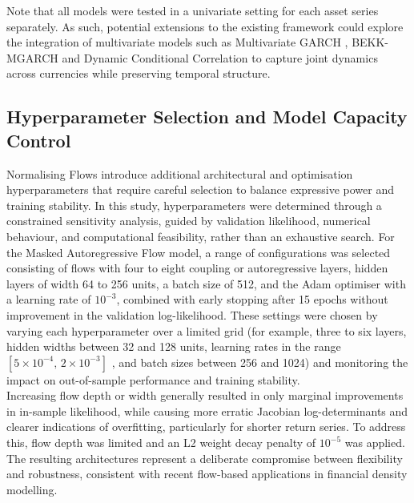\documentclass[oneside,12pt]{CUEDthesisPSnPDF}
\newcommand{\textcite}{\citet}
\begin{document}
Note that all models were tested in a univariate setting for each asset series separately. As such, potential extensions to the existing framework could explore the integration of multivariate models such as Multivariate GARCH \textcite{bollerslev1990modelling}, BEKK-MGARCH \textcite{engle1995multivariate} and Dynamic Conditional Correlation \textcite{engle2002dynamic} to capture joint dynamics across currencies while preserving temporal structure.\\


\subsection{Hyperparameter Selection and Model Capacity Control}
\label{subsec:hyperparams}
\noindent
Normalising Flows introduce additional architectural and optimisation hyperparameters that require careful selection to balance expressive power and training stability. In this study, hyperparameters were determined through a constrained sensitivity analysis, guided by validation likelihood, numerical behaviour, and computational feasibility, rather than an exhaustive search. For the Masked Autoregressive Flow model, a range of configurations was selected consisting of flows with four to eight coupling or autoregressive layers, hidden layers of width 64 to 256 units, a batch size of 512, and the Adam optimiser with a learning rate of $10^{-3}$, combined with early stopping after 15 epochs without improvement in the validation log-likelihood. These settings were chosen by varying each hyperparameter over a limited grid (for example, three to six layers, hidden widths between 32 and 128 units, learning rates in the range $[5 \times 10^{-4},\, 2 \times 10^{-3}]$
, and batch sizes between 256 and 1024) and monitoring the impact on out-of-sample performance and training stability. \\

Increasing flow depth or width generally resulted in only marginal improvements in in-sample likelihood, while causing more erratic Jacobian log-determinants and clearer indications of overfitting, particularly for shorter return series. To address this, flow depth was limited and an L2 weight decay penalty of $10^{-5}$ was applied. The resulting architectures represent a deliberate compromise between flexibility and robustness, consistent with recent flow-based applications in financial density modelling. \\
\end{document}
